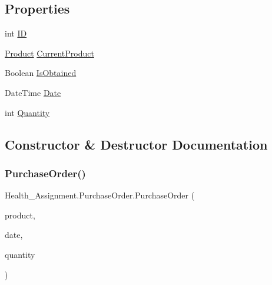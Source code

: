 \subsection*{Properties}
\begin{DoxyCompactItemize}
\item 
int \hyperlink{class_health___assignment_1_1_purchase_order_a188e84b9422b241d979f0a3429a8f52c}{ID}
\item 
\hyperlink{class_health___assignment_1_1_product}{Product} \hyperlink{class_health___assignment_1_1_purchase_order_a9474e646b6fbfb773783e601c321a9f7}{Current\+Product}
\item 
Boolean \hyperlink{class_health___assignment_1_1_purchase_order_a1b07767444172a9e80995650e10b01f8}{Is\+Obtained}
\item 
Date\+Time \hyperlink{class_health___assignment_1_1_purchase_order_a2ff9a68d718881e55d87edb3941905da}{Date}
\item 
int \hyperlink{class_health___assignment_1_1_purchase_order_ab6d01a3e7c2cb8e2c5c37159a2fd1337}{Quantity}
\end{DoxyCompactItemize}


\subsection{Constructor \& Destructor Documentation}
\mbox{\label{class_health___assignment_1_1_purchase_order_a3c7ee17948ca9538d4082cdfc0afc7ba}} 
\subsubsection{\texorpdfstring{Purchase\+Order()}{PurchaseOrder()}\hspace{0.1cm}{\footnotesize\ttfamily [1/2]}}
{\footnotesize\ttfamily Health\+\_\+\+Assignment.\+Purchase\+Order.\+Purchase\+Order (\begin{DoxyParamCaption}\item[{\hyperlink{class_health___assignment_1_1_product}{Product}}]{product,  }\item[{Date\+Time}]{date,  }\item[{int}]{quantity }\end{DoxyParamCaption})\hspace{0.3cm}{\ttfamily [inline]}}

